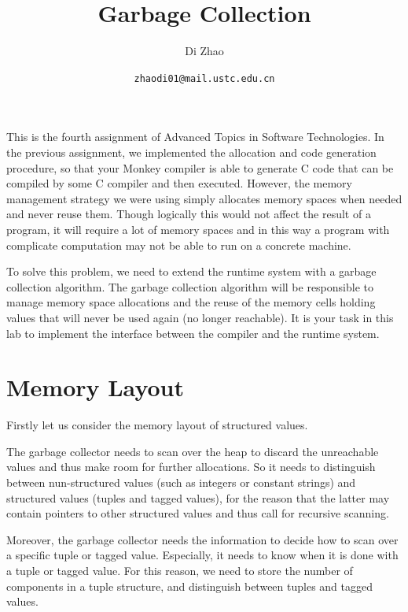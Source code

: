 \documentclass{article}
\theoremstyle{definition}
\theoremstyle{remark}
\numberwithin{equation}{section}
\begin{document}
\newcommand{\env}[1]{[\![#1]\!]\kappa}
\newcommand{\round}[1]{(\!|#1|\!)}

\title{Garbage Collection}%
\author{Di Zhao}%
\date{\small{\texttt{zhaodi01@mail.ustc.edu.cn}}}%

\maketitle

This is the fourth assignment of Advanced Topics in Software
Technologies. In the previous assignment, we implemented the allocation
and code generation procedure, so that your Monkey compiler is able to
generate C code that can be compiled by some C compiler and then executed.
 However, the memory management strategy we
were using simply allocates memory spaces when needed and never reuse them.
Though logically this would not affect the result of a program, it will
require a lot of memory spaces and in this way a program with complicate
computation may not be able to run on a concrete machine.

To solve this problem, we need to extend the runtime system with
a garbage collection algorithm. The garbage collection algorithm will be
responsible to manage memory space allocations and the reuse of the memory
cells holding values that will never be used again (no longer reachable).
It is your task in this lab to implement the interface between the
compiler and the runtime system.

\section{Memory Layout}

Firstly let us consider the memory layout of structured values.

 The garbage
collector needs to scan over the heap to discard the unreachable values
 and thus make room for further allocations. So it needs to distinguish between
 nun-structured values (such as integers or constant strings) and structured values
 (tuples and tagged values), for the reason that the latter may contain pointers
 to other structured values and thus call for recursive scanning.

Moreover, the garbage collector needs the information to decide how to scan over
a specific tuple or tagged value. Especially, it needs to know when it is done with
a tuple or tagged value. For this reason, we need to store the number of components
in a tuple structure, and distinguish between tuples and tagged values.
\end{document}
